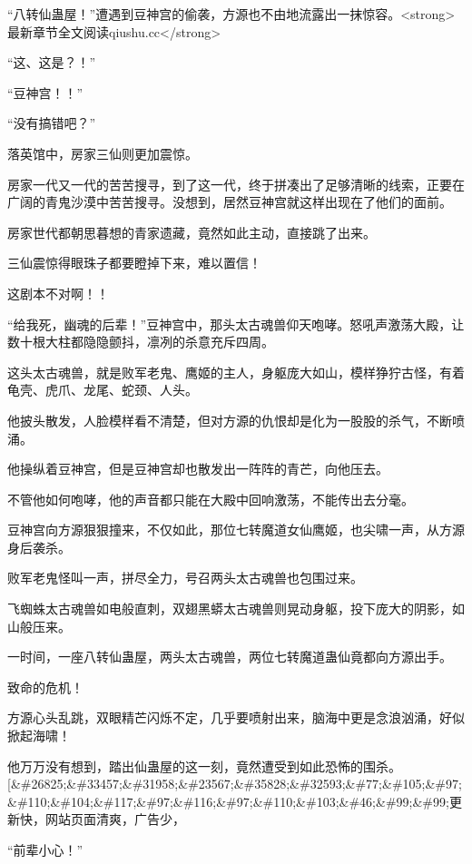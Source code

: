 
\begin{this_body}

“八转仙蛊屋！”遭遇到豆神宫的偷袭，方源也不由地流露出一抹惊容。<strong>最新章节全文阅读qiushu.cc</strong>

“这、这是？！”

“豆神宫！！”

“没有搞错吧？”

落英馆中，房家三仙则更加震惊。

房家一代又一代的苦苦搜寻，到了这一代，终于拼凑出了足够清晰的线索，正要在广阔的青鬼沙漠中苦苦搜寻。没想到，居然豆神宫就这样出现在了他们的面前。

房家世代都朝思暮想的青家遗藏，竟然如此主动，直接跳了出来。

三仙震惊得眼珠子都要瞪掉下来，难以置信！

这剧本不对啊！！

“给我死，幽魂的后辈！”豆神宫中，那头太古魂兽仰天咆哮。怒吼声激荡大殿，让数十根大柱都隐隐颤抖，凛冽的杀意充斥四周。

这头太古魂兽，就是败军老鬼、鹰姬的主人，身躯庞大如山，模样狰狞古怪，有着龟壳、虎爪、龙尾、蛇颈、人头。

他披头散发，人脸模样看不清楚，但对方源的仇恨却是化为一股股的杀气，不断喷涌。

他操纵着豆神宫，但是豆神宫却也散发出一阵阵的青芒，向他压去。

不管他如何咆哮，他的声音都只能在大殿中回响激荡，不能传出去分毫。

豆神宫向方源狠狠撞来，不仅如此，那位七转魔道女仙鹰姬，也尖啸一声，从方源身后袭杀。

败军老鬼怪叫一声，拼尽全力，号召两头太古魂兽也包围过来。

飞蜘蛛太古魂兽如电般直刺，双翅黑蟒太古魂兽则晃动身躯，投下庞大的阴影，如山般压来。

一时间，一座八转仙蛊屋，两头太古魂兽，两位七转魔道蛊仙竟都向方源出手。

致命的危机！

方源心头乱跳，双眼精芒闪烁不定，几乎要喷射出来，脑海中更是念浪汹涌，好似掀起海啸！

他万万没有想到，踏出仙蛊屋的这一刻，竟然遭受到如此恐怖的围杀。[\&\#26825;\&\#33457;\&\#31958;\&\#23567;\&\#35828;\&\#32593;\&\#77;\&\#105;\&\#97;\&\#110;\&\#104;\&\#117;\&\#97;\&\#116;\&\#97;\&\#110;\&\#103;\&\#46;\&\#99;\&\#99;更新快，网站页面清爽，广告少，

“前辈小心！”


\end{this_body}
